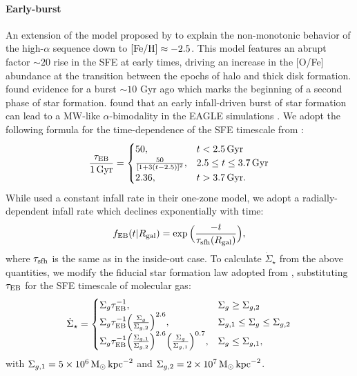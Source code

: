 \documentclass[twocolumn,twocolappendix]{aastex631}
\begin{document}
\paragraph{Early-burst} An extension of the model proposed by \citet{Conroy2022-ThickDisk} to explain the non-monotonic behavior of the high-$\alpha$ sequence down to ${\rm [Fe/H]}\approx-2.5$. This model features an abrupt factor $\sim20$ rise in the SFE at early times, driving an increase in the [O/Fe] abundance at the transition between the epochs of halo and thick disk formation. \citet{Stahlholdt2022-StarFormationEpochs} found evidence for a burst $\sim10$ Gyr ago which marks the beginning of a second phase of star formation. \citet{Mackereth2018-AlphaBimodality} found that an early infall-driven burst of star formation can lead to a MW-like $\alpha$-bimodality in the EAGLE simulations \citep{Crain2015-EAGLE,Schaye2015-EAGLE}. We adopt the following formula for the time-dependence of the SFE timescale from \citet{Conroy2022-ThickDisk}:
\begin{equation}
    \frac{\tau_{\rm EB}}{1\,\rm{Gyr}} =
    \begin{cases}
        50, & t < 2.5\,\rm{Gyr} \\
        \frac{50}{[1+3(t-2.5)]^2}, & 2.5\leq t \leq 3.7\,\rm{Gyr} \\
        2.36, & t > 3.7\,\rm{Gyr}.
    \end{cases}
    \label{eq:earlyburst-taustar}
\end{equation}
While \citet{Conroy2022-ThickDisk} used a constant infall rate in their one-zone model, we adopt a radially-dependent infall rate which declines exponentially with time:
\begin{equation}
    f_{\rm EB}(t|R_{\rm gal}) = \exp\Big(\frac{-t}{\tau_{\rm sfh}(R_{\rm gal})}\Big),
    \label{eq:earlyburst-ifr}
\end{equation}
where $\tau_{\rm sfh}$ is the same as in the inside-out case.
To calculate $\dot \Sigma_\star$ from the above quantities, we modify the fiducial star formation law adopted from , substituting $\tau_{\rm EB}$ for the SFE timescale of molecular gas:
\begin{equation}
    \dot \Sigma_\star = 
    \begin{cases}
        \Sigma_g \tau_{\rm EB}^{-1}, & \Sigma_g \geq \Sigma_{g,2} \\
        \Sigma_g \tau_{\rm EB}^{-1} \Big(\frac{\Sigma_g}{\Sigma_{g,2}}\Big)^{2.6}, & \Sigma_{g,1} \leq \Sigma_g \leq \Sigma_{g,2} \\
        \Sigma_g \tau_{\rm EB}^{-1} \Big(\frac{\Sigma_{g,1}}{\Sigma_{g,2}}\Big)^{2.6} \Big(\frac{\Sigma_g}{\Sigma_{g,1}}\Big)^{0.7}, & \Sigma_g \leq \Sigma_{g,1},
    \end{cases}
    \label{eq:earlyburst-sfr}
\end{equation}
with $\Sigma_{g,1}=5\times 10^6\,{\rm M}_\odot\,{\rm kpc}^{-2}$ and $\Sigma_{g,2}=2\times 10^7\,{\rm M}_\odot\,{\rm kpc}^{-2}$.
\end{document}
